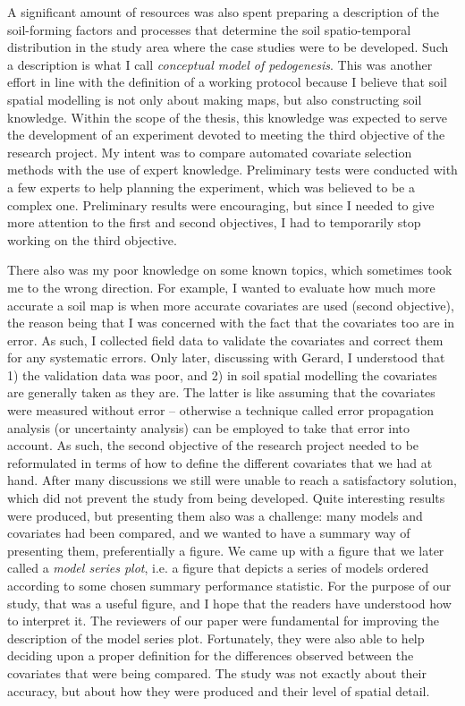 A significant amount of resources was also spent preparing a description of the soil-forming factors and 
processes that determine the soil spatio-temporal distribution in the study area where the case studies were to 
be developed. Such a description is what I call \emph{conceptual model of pedogenesis}. This was another effort 
in line with the definition of a working protocol because I believe that soil spatial modelling is not only 
about making maps, but also constructing soil knowledge. Within the scope of the thesis, this knowledge was 
expected to serve the development of an experiment devoted to meeting the third objective of the research 
project. My intent was to compare automated covariate selection methods with the use of expert knowledge. 
Preliminary tests were conducted with a few experts to help planning the experiment, which was believed to be a 
complex one. Preliminary results were encouraging, but since I needed to give more attention to the first and 
second objectives, I had to temporarily stop working on the third objective.

There also was my poor knowledge on some known topics, which sometimes took me to the wrong direction. For 
example, I wanted to evaluate how much more accurate a soil map is when more accurate covariates are used 
(second objective), the reason being that I was concerned with the fact that the covariates too are in error. 
As such, I collected field data to validate the covariates and correct them for any systematic errors. Only 
later, discussing with Gerard, I understood that 1) the validation data was poor, and 2) in soil spatial 
modelling the covariates are generally taken as they are. The latter is like assuming that the covariates were 
measured without error -- otherwise a technique called error propagation analysis (or uncertainty analysis) can 
be employed to take that error into account. As such, the second objective of the research project needed to be 
reformulated in terms of how to define the different covariates that we had at hand. After many discussions we 
still were unable to reach a satisfactory solution, which did not prevent the study from being developed. Quite 
interesting results were produced, but presenting them also was a challenge: many models and covariates had 
been compared, and we wanted to have a summary way of presenting them, preferentially a figure. We came up with 
a figure that we later called a \emph{model series plot}, i.e. a figure that depicts a series of models ordered 
according to some chosen summary performance statistic. For the purpose of our study, that was a useful figure, 
and I hope that the readers have understood how to interpret it. The reviewers of our paper were fundamental 
for improving the description of the model series plot. Fortunately, they were also able to help deciding upon 
a proper definition for the differences observed between the covariates that were being compared. The study was 
not exactly about their accuracy, but about how they were produced and their level of spatial detail.

